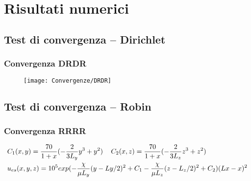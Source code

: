 \section{Risultati numerici}


\subsection{Test di convergenza -- Dirichlet}

\begin{frame}
\frametitle{Convergenza DRDR}

\begin{figure}[!h]
\centering
\texttt{[image: Convergenze/DRDR]}
\label{fig:drdrconv}
\end{figure}
\end{frame}

\subsection{Test di convergenza -- Robin}

\begin{frame}
\frametitle{Convergenza RRRR}
{\footnotesize
\begin{equation}
\begin{split}
& C_1(x,y)=\frac{70}{1+x}(-\frac{2}{3L_y} y^3+ y^2) \psp{7}
C_2(x,z)=\frac{70}{1+x}(-\frac{2}{3L_z}z^3+z^2) \\
& u_{es}(x,y,z)=10^5exp( - \frac{\chi}{\mu L_y} (y - Ly/2 )^2 + C_1  - \frac{\chi}{\mu L_z}(z - L_z/2 ) ^ 2 + C_2 )(Lx-x)^2 
\end{split}
\end{equation}
}
\begin{figure}[!h]
\centering
{}
\end{figure}

\end{frame}

